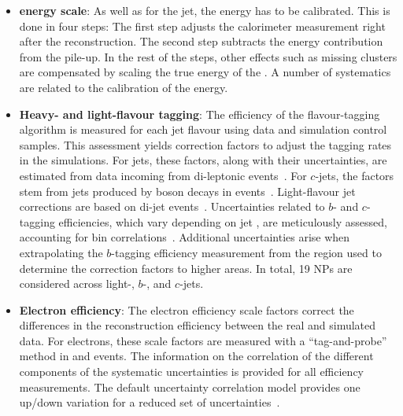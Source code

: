 \begin{itemize}

	\item \textbf{\tauhad energy scale}: As well as for the jet, the \tauhad energy has to be calibrated. 
		This is done in four steps: The first step adjusts the calorimeter measurement right after the 
		reconstruction. The second step subtracts the energy contribution from the pile-up. 
		In the rest of the steps, other effects such as missing clusters are compensated by scaling the 
		true energy of the \Ptau. 
		A number of systematics are related to the calibration of the \tauhad energy. 
		
		
	\item \textbf{Heavy- and light-flavour tagging}: The efficiency of the flavour-tagging algorithm is 
		 measured for each jet flavour using data and simulation control samples. This assessment 
		 yields correction factors to adjust the tagging rates in the simulations. For \btagged jets, 
		 these factors, along with their uncertainties, are estimated from data incoming from
		 di-leptonic \ttbar events~\cite{ATLAS:2017ywy,FTAG-2018-01}.
		 For $c$-jets, the factors stem from jets produced by \PW boson decays in \ttbar 
		 events~\cite{ATLAS-CONF-2018-001}. Light-flavour jet corrections are based on 
		 di-jet events~\cite{ATLAS-CONF-2018-006}. Uncertainties related to $b$- and 
		 $c$-tagging efficiencies, which vary depending on jet \pT, are meticulously assessed, 
		 accounting for bin correlations~\cite{FTAG-2018-01}.
		 Additional uncertainties arise when extrapolating the $b$-tagging efficiency measurement 
		 from the \pT region used to determine the correction factors to higher \pt areas. 
		 In total, 19 NPs are considered across light-, $b$-, and $c$-jets.
		 
	\item \textbf{Electron efficiency}: The electron efficiency scale factors correct the differences in the reconstruction 
		efficiency between the real and simulated data.  For electrons, these scale factors are measured with a 
		``tag-and-probe'' method in \Zepem and \Jee events. %
		The information on the correlation of the different components of the systematic 
		uncertainties is provided for all efficiency measurements. The default uncertainty correlation model
		provides one up/down variation for a reduced set of uncertainties~\cite{EGAM-2018-01,PERF-2017-01}.
			

\end{itemize}
